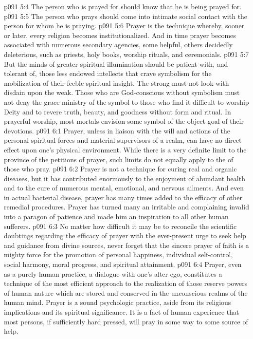 \pc \vs p091 5:4 \bibnobreakspace The person who is prayed for should know that he is being prayed for.
\vs p091 5:5 \bibnobreakspace The person who prays should come into intimate social contact with the person for whom he is praying.
\pc \vs p091 5:6 Prayer is the technique whereby, sooner or later, every religion becomes institutionalized. And in time prayer becomes associated with numerous secondary agencies, some helpful, others decidedly deleterious, such as priests, holy books, worship rituals, and ceremonials.
\vs p091 5:7 But the minds of greater spiritual illumination should be patient with, and tolerant of, those less endowed intellects that crave symbolism for the mobilization of their feeble spiritual insight. The strong must not look with disdain upon the weak. Those who are God\hyp{}conscious without symbolism must not deny the grace\hyp{}ministry of the symbol to those who find it difficult to worship Deity and to revere truth, beauty, and goodness without form and ritual. In prayerful worship, most mortals envision some symbol of the object\hyp{}goal of their devotions.
\vs p091 6:1 Prayer, unless in liaison with the will and actions of the personal spiritual forces and material supervisors of a realm, can have no direct effect upon one’s physical environment. While there is a very definite limit to the province of the petitions of prayer, such limits do not equally apply to the  of those who pray.
\vs p091 6:2 Prayer is not a technique for curing real and organic diseases, but it has contributed enormously to the enjoyment of abundant health and to the cure of numerous mental, emotional, and nervous ailments. And even in actual bacterial disease, prayer has many times added to the efficacy of other remedial procedures. Prayer has turned many an irritable and complaining invalid into a paragon of patience and made him an inspiration to all other human sufferers.
\vs p091 6:3 No matter how difficult it may be to reconcile the scientific doubtings regarding the efficacy of prayer with the ever\hyp{}present urge to seek help and guidance from divine sources, never forget that the sincere prayer of faith is a mighty force for the promotion of personal happiness, individual self\hyp{}control, social harmony, moral progress, and spiritual attainment.
\vs p091 6:4 Prayer, even as a purely human practice, a dialogue with one’s alter ego, constitutes a technique of the most efficient approach to the realization of those reserve powers of human nature which are stored and conserved in the unconscious realms of the human mind. Prayer is a sound psychologic practice, aside from its religious implications and its spiritual significance. It is a fact of human experience that most persons, if sufficiently hard pressed, will pray in some way to some source of help.
